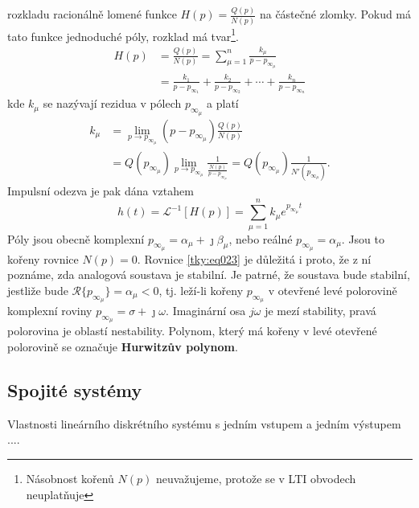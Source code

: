       rozkladu racionálně lomené funkce $H(p)=\frac{Q(p)}{N(p)}$ na částečné zlomky. Pokud má tato 
      funkce jednoduché póly, rozklad má tvar\footnote{Násobnost kořenů $N(p)$ neuvažujeme, protože 
      se v LTI obvodech neuplatňuje}.
      \begin{align}
         H(p)&=\frac{Q(p)}{N(p)} 
              =\sum_{\mu=1}^{n}\frac{k_\mu}{p-p_{\infty_\mu}}                  \nonumber \\
             &=\frac{k_1}{p-p_{\infty_1}}+\frac{k_2}{p-p_{\infty_2}}
               +\cdots+\frac{k_n}{p-p_{\infty_n}}                              \label{tky:eq004}
      \end{align}
      kde $k_\mu$ se nazývají rezidua v pólech $p_{\infty_\mu}$ a platí
      \begin{align}
        k_\mu &= \lim_{p\to p_{\infty_\mu}}(p-p_{\infty_\mu})\frac{Q(p)}{N(p)}  \nonumber \\
        \,    &= Q(p_{\infty_\mu})\lim_{p\to
                 p_{\infty_\mu}}\frac{1}{\frac{N(p)}{p-p_{\infty_\mu}}}=
                 Q(p_{\infty_\mu})\frac{1}{N'(p_{\infty_\mu})}.                 \label{tky:eq006}
      \end{align}
      Impulsní odezva je pak dána vztahem
      \begin{equation}\label{tky:eq023}
        h(t)=\mathcal{L}^{-1}[H(p)]=\sum_{\mu=1}^nk_\mu e^{p_{\infty_\mu}t}
      \end{equation}
      Póly jsou obecně komplexní $p_{\infty_{\mu}}=\alpha_\mu+\jmath\beta_\mu$, nebo reálné
      $p_{\infty_{\mu}}=\alpha_\mu$. Jsou to kořeny rovnice $N(p)=0$. Rovnice \ref{tky:eq023} je
      důležitá i proto, že z ní poznáme, zda analogová soustava je stabilní. Je patrné, že soustava
      bude stabilní, jestliže bude $\mathcal{R}\{p_{\infty_{\mu}}\}=\alpha_\mu<0$, tj. leží-li
      kořeny $p_{\infty_{\mu}}$ v otevřené levé polorovině komplexní roviny
      $p_{\infty_{\mu}}=\sigma+\jmath\omega$. Imaginární osa $j\omega$ je mezí stability, pravá
      polorovina je oblastí nestability. Polynom, který má kořeny v levé otevřené polorovině se
      označuje \textbf{Hurwitzův polynom}.

      
    
    \subsection{Spojité systémy}\label{tky:IchIIsecIIIssecII}
      Vlastnosti lineárního diskrétního systému s jedním vstupem a jedním výstupem ....